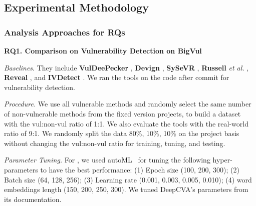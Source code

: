 \subsection{Experimental Methodology}
\label{method:sec}





\subsubsection{\textbf{Analysis Approaches for RQs\\}}

\noindent\textbf{RQ1. Comparison on Vulnerability Detection on BigVul}

\emph{Baselines}. They include
\textbf{VulDeePecker} \cite{li2018vuldeepecker}, \textbf{Devign}
\cite{zhou2019devign}, \textbf{SySeVR} \cite{li2021sysevr},
\textbf{Russell} {\em et al.}  \cite{russell2018automated},
\textbf{Reveal} \cite{chakraborty2021deep}, and {\bf IVDetect}
\cite{fse21}. We ran the tools on the code after commit for
vulnerability detection.

\emph{Procedure.}  We use all vulnerable methods and randomly select
the same number of non-vulnerable methods from the fixed version
projects, to build a dataset with the vul:non-vul ratio of 1:1. We
also evaluate the tools with the real-world ratio of 9:1. We randomly split the
data 80\%, 10\%, 10\% on the project basis without changing the
vul:non-vul ratio for training, tuning, and testing.

\emph{Parameter Tuning.}  For {\tool}, we used
autoML~\cite{NNI} for tuning the following hyper-parameters to have the
best performance: (1) Epoch size (100, 200, 300); (2) Batch size (64,
128, 256); (3) Learning rate (0.001, 0.003, 0.005, 0.010); (4) word embeddings length (150, 200, 250, 300). We
tuned DeepCVA's parameters from its documentation.

